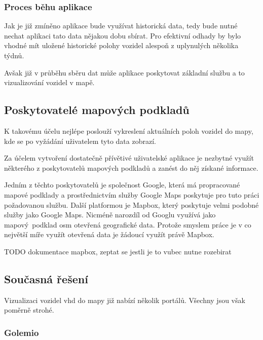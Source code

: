 \subsubsection{Proces běhu aplikace}

Jak je již zmíněno aplikace bude využívat historická data, tedy bude nutné nechat aplikaci tato data nějakou dobu sbírat. Pro efektivní odhady by bylo vhodné mít uložené historické polohy vozidel alespoň z uplynulých několika týdnů.

\bigbreak

Avšak již v průběhu sběru dat může aplikace poskytovat základní službu a to vizualizování vozidel v mapě.

\subsection{Poskytovatelé mapových podkladů}

K takovému účelu nejlépe poslouží vykreslení aktuálních poloh vozidel do mapy, kde se po vyžádání uživatelem tyto data zobrazí.

\bigbreak

Za účelem vytvoření dostatečně přívětivé uživatelské aplikace je nezbytné využít některého z poskytovatelů mapových podkladů a zanést do něj získané informace.

\bigbreak

Jedním z těchto poskytovatelů je společnost Google, která má propracované mapové podklady a prostřednictvím služby Google Maps poskytuje pro tuto práci požadovanou službu. Další platformou je Mapbox, který poskytuje velmi podobné služby jako Google Maps. Nicméně narozdíl od Googlu využívá jako mapový podklad \gls{osm} {otevřená geografické data}. Protože smyslem práce je v co největší míře využít otevřená data je žádoucí využít právě Mapbox.

\bigbreak

TODO dokumentace mapbox, zeptat se jestli je to vubec nutne rozebirat

\subsection{Současná řešení}

Vizualizaci vozidel \gls{vhd} do mapy již nabízí několik portálů. Všechny jsou však poměrně strohé.

\subsubsection{Golemio}

